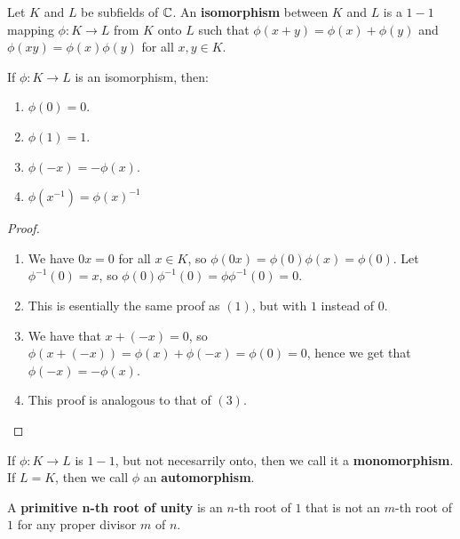 \begin{definition}
    Let $K$ and  $L$ be subfields of  $\mathbb{C}$. An \textbf{isomorphism} between  $K$ 
    and $L$ is a $1-1$ mapping $\phi:K \rightarrow L$ from $K$ onto  $L$ such 
    that $\phi(x+y)=\phi(x)+\phi(y)$ and $\phi(xy)=\phi(x)\phi(y)$ for all $x,y 
    \in K$.
\end{definition}

\begin{proposition}\label{proposition1.2.1}
    If $\phi:K \rightarrow L$ is an isomorphism, then:
        \begin{enumerate}[label=(\arabic*)]
            \item $\phi(0)=0$.

            \item  $\phi(1)=1$.

            \item  $\phi(-x)=-\phi(x)$. 

            \item $\phi(x^{-1})=\phi(x)^{-1}$
        \end{enumerate}
\end{proposition}
\begin{proof}
    \begin{enumerate}[label=(\arabic*)]
        \item We have $0x=0$ for all  $x \in K$, so  $\phi(0x)=\phi(0)\phi(x)=
            \phi(0)$. Let  $\phi^{-1}(0)=x$, so  $\phi(0)\phi^{-1}(0)=
            \phi\phi^{-1}(0)=0$.

        \item This is esentially the same proof as $(1)$, but with  $1$ instead 
            of  $0$.

        \item We have that  $x+(-x)=0$, so $\phi(x+(-x))=\phi(x)+\phi(-x)=\phi(0)
            =0$, hence we get that $\phi(-x)=-\phi(x)$.

        \item This proof is analogous to that of $(3)$.
    \end{enumerate}		
\end{proof}

If $\phi:K \rightarrow L$ is  $1-1$, but not necesarrily onto, then we call it a 
\textbf{monomorphism}. If $L=K$, then we call  $\phi$ an \textbf{automorphism}.

 \begin{definition}
    A \textbf{primitive n-th root of unity} is an $n$-th root of $1$ that is not 
    an $m$-th root of  $1$ for any proper divisor  $m$ of  $n$.
\end{definition}

